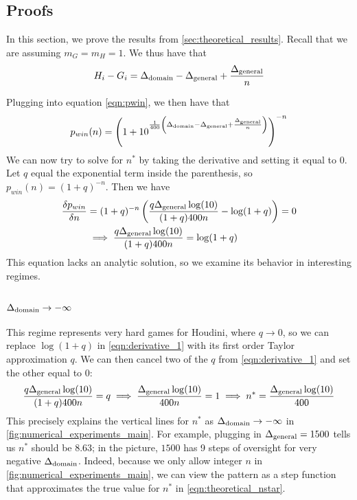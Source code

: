 \documentclass{article}
\begin{document}
\subsection{Proofs}

\label{app:proofs}
In this section, we prove the results from \cref{sec:theoretical_results}. Recall that we are assuming $m_G = m_H = 1$. We thus have that
\begin{align}
    H_i - G_i = \Delta_{\rm domain} - \Delta_{\rm general} + \frac{\Delta_{\rm general}}{n}
\end{align}

Plugging into equation \cref{eqn:pwin}, we then have that
\begin{align}
    p_{win}(n) = \left(1 + 10^{\frac{1}{400}\left(\Delta_{\rm domain} - \Delta_{\rm general} + \frac{\Delta_{\rm general}}{n}\right)}\right)^{-n}
\end{align}
We can now try to solve for $n^*$ by taking the derivative and setting it equal to $0$. Let $q$ equal the exponential term inside the parenthesis, so $p_{win}(n) = (1+q)^{-n}$. Then we have
\begin{align}
     \label{eqn:derivative_1}
     \frac{\delta p_{win}}{\delta n} &= (1 + q)^{-n}\left( \frac{q\Delta_{\rm general} \log(10)}{(1 + q)400n} - \log(1 + q)\right) = 0 \\
     \label{eqn:derivative_2}
     &\implies \frac{q\Delta_{\rm general} \log(10)}{(1 + q)400n} = \log(1 + q)
\end{align}
This equation lacks an analytic solution, so we examine its behavior in interesting regimes.


\subsubsection{$\Delta_{\rm domain} \rightarrow -\infty$}
This regime represents very hard games for Houdini, where $q \rightarrow 0$, so we can replace $\log(1 + q)$ in \cref{eqn:derivative_1} with its first order Taylor approximation $q$. We can then cancel two of the $q$ from \cref{eqn:derivative_1} and set the other equal to $0$:
\begin{align}
\label{eqn:theoretical_nstar}
    \frac{q\Delta_{\rm general}\log(10)}{(1 + q)400n} = q \implies \frac{\Delta_{\rm general}\log(10)}{400n} = 1  \implies n^* = \frac{\Delta_{\rm general}\log(10)}{400}
\end{align}
This precisely explains the vertical lines for $n^*$ as $\Delta_{\rm domain} \rightarrow -\infty$ in \cref{fig:numerical_experiments_main}. For example, plugging in $\Delta_{\rm general} = 1500$ tells us $n^*$ should be $8.63$; in the picture, $1500$ has 9 steps of oversight for very negative $\Delta_{\rm domain}$. Indeed, because we only allow integer $n$ in \cref{fig:numerical_experiments_main}, we can view the pattern as a step function that approximates the true value for $n^*$ in \cref{eqn:theoretical_nstar}. 
\end{document}
